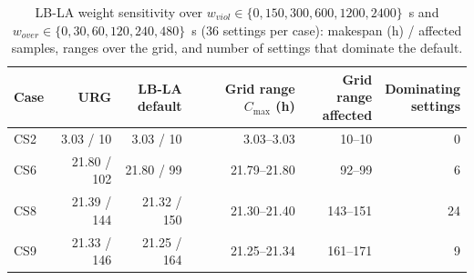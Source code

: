 \begin{table}[tbp]
\caption{LB-LA weight sensitivity over $w_{viol}\in\{0,150,300,600,1200,2400\}$~s and $w_{over}\in\{0,30,60,120,240,480\}$~s (36 settings per case): makespan (h) / affected samples, ranges over the grid, and number of settings that dominate the default.\label{tab:weights}}
\centering
\footnotesize
\setlength{\tabcolsep}{3pt}
\begin{tabular*}{\textwidth}{@{\extracolsep{\fill}}lrrrrr@{}}
\toprule
Case & URG & \shortstack{LB-LA\\default} & \shortstack{Grid range\\$C_{\max}$ (h)} & \shortstack{Grid range\\affected} & \shortstack{Dominating\\settings}\\
\midrule
CS2 & 3.03 / 10 & 3.03 / 10 & 3.03--3.03 & 10--10 & 0\\
CS6 & 21.80 / 102 & 21.80 / 99 & 21.79--21.80 & 92--99 & 6\\
CS8 & 21.39 / 144 & 21.32 / 150 & 21.30--21.40 & 143--151 & 24\\
CS9 & 21.33 / 146 & 21.25 / 164 & 21.25--21.34 & 161--171 & 9\\
\bottomrule
\end{tabular*}
\end{table}

